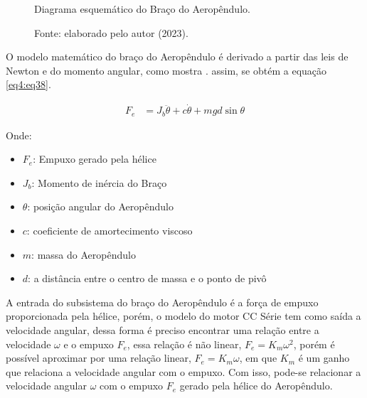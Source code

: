 \begin{figure}[!h]
	\centering
	\caption{Diagrama esquemático do Braço do Aeropêndulo.}
	\caption*{Fonte: elaborado pelo autor (2023).}
        \label{fig4:image_04}
\end{figure}


O modelo matemático do braço do Aeropêndulo é derivado a partir das leis de Newton e do momento angular, como mostra \cite{amin}. assim, se obtém a equação \ref{eq4:eq38}.

\begin{align}
    F_e &= J_b\ddot{\theta} + c\dot{\theta} +mgd\sin{\theta}  \label{eq4:eq38}
\end{align}

\noindent Onde:

\begin{itemize}
        \setlength{\itemsep}{-2pt}
	\item  $F_e$: Empuxo gerado pela hélice
        \item  $J_b$: Momento de inércia do Braço
        \item  $\theta$: posição angular do Aeropêndulo
        \item  $c$: coeficiente de amortecimento viscoso
        \item  $m$: massa do Aeropêndulo
        \item  $d$: a distância entre o centro de massa e o ponto de pivô
\end{itemize}

A entrada do subsistema do braço do Aeropêndulo é a força de empuxo proporcionada pela hélice, porém, o modelo do motor CC Série tem como saída a velocidade angular, dessa forma é preciso encontrar uma relação entre a velocidade $\omega$ e o empuxo $F_e$, essa relação é não linear, $F_e = K_m\omega^2$, porém é possível aproximar por uma relação linear,  $F_e = K_m\omega$, em que $K_m$ é um ganho que relaciona a velocidade angular com o empuxo. Com isso, pode-se relacionar a velocidade angular $\omega$  com o empuxo $F_e$ gerado pela hélice do Aeropêndulo.

